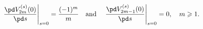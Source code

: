 \begin{equation}
\left.\frac{\pd V_{2m}^{(s)}(0)}{\pd s}\right|_{s=0}
=\frac{(-1)^m}{m}
\quad\text{and}\quad
\left.\frac{\pd V_{2m-1}^{(s)}(0)}{\pd s}\right|_{s=0}
=0,\quad m\geqslant 1.
\label{C4}
\end{equation}

